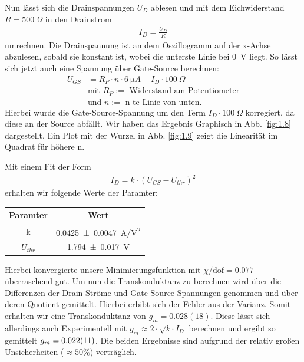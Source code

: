 \documentclass[10pt]{article}
\newenvironment{Figure}
  {\par\medskip\noindent\minipage{\linewidth}}
  {\endminipage\par\medskip}
\begin{document}
\begin{multicols}{2}
	Nun lässt sich die Drainspannungen $U_D$ ablesen und mit dem Eichwiderstand $R = \SI{500}{\Omega}$ in den Drainstrom
	\begin{align*}
		I_D = \frac{U_D}{R}
	\end{align*}
	umrechnen. Die Drainspannung ist an dem Oszillogramm auf der x-Achse abzulesen, sobald sie konstant ist, wobei die unterste Linie bei \SI{0}{V} liegt. So lässt sich jetzt auch eine Spannung über Gate-Source berechnen:
	\begin{align*}
		U_{GS} & = R_P \cdot n \cdot \SI{6}{\micro A} - I_D \cdot \SI{100}{\Omega} \\
		       & \text{mit } R_P:=\text{ Widerstand am Potentiometer}              \\
		       & \text{und } n:=\text{ n-te Linie von unten.}
	\end{align*}
	Hierbei wurde die Gate-Source-Spannung um den Term $I_D \cdot \SI{100}{\Omega}$ korregiert, da diese an der Source abfällt. Wir haben das Ergebnis Graphisch in Abb. \ref{fig:1.8} dargestellt. Ein Plot mit der Wurzel in Abb. \ref{fig:1.9} zeigt die Linearität im Quadrat für höhere n.
	\begin{Figure}
		\centering\resizebox{\textwidth}{!}{}
		\label{fig:1.8}
	\end{Figure}
	\begin{Figure}
		\centering\resizebox{\textwidth}{!}{}
		\label{fig:1.9}
	\end{Figure}

	Mit einem Fit der Form
	\begin{align*}
		I_D=k\cdot(U_{GS} - U_{thr})^2
	\end{align*}
	erhalten wir folgende Werte der Paramter:
	\begin{center}
		\begin{tabular}{|c|c|}
			\hline
			Paramter  & Wert                       \\
			\hline
			k         & \SI{0.0425+-0.0047}{A/V^2} \\
			$U_{thr}$ & \SI{1.794+-0.017}{V}       \\
			\hline
		\end{tabular}
		\label{Tab:1.2}
	\end{center}
	Hierbei konvergierte unsere Minimierungsfunktion mit $\chi/\text{dof}=0.077$ überraschend gut.
	Um nun die Transkonduktanz zu berechnen wird über die Differenzen der Drain-Ströme und Gate-Source-Spannungen genommen und über deren Quotient gemittelt. Hierbei erbibt sich der Fehler aus der Varianz. Somit erhalten wir eine Transkonduktanz von $g_m=0.028(18)$. Diese lässt sich allerdings auch Experimentell mit $g_m\approx2 \cdot \sqrt{k\cdot I_D}$ berechnen und ergibt so gemittelt $g_m=\SI{0.022+-0.011}{}$. Die beiden Ergebnisse sind aufgrund der relativ großen Unsicherheiten ($\approx 50\%$) verträglich.




\end{multicols}
\end{document}
